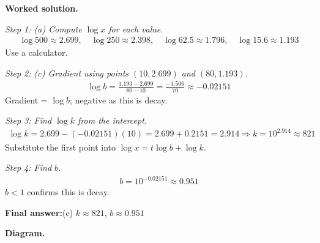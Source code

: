 \documentclass[11pt]{article}
\begin{document}
\textbf{Worked solution.}

\textit{Step 1: (a) Compute \( \log x \) for each value.}
\[\begin{gathered}
\log 500 \approx 2.699, \quad \log 250 \approx 2.398, \quad \log 62.5 \approx 1.796, \quad \log 15.6 \approx 1.193
\end{gathered}\]
Use a calculator.

\textit{Step 2: (c) Gradient using points \( (10, 2.699) \) and \( (80, 1.193) \).}
\[\begin{gathered}
\log b = \frac{1.193 - 2.699}{80 - 10} = \frac{-1.506}{70} \approx -0.02151
\end{gathered}\]
Gradient = \( \log b \); negative as this is decay.

\textit{Step 3: Find \( \log k \) from the intercept.}
\[\begin{gathered}
\log k = 2.699 - (-0.02151)(10) = 2.699 + 0.2151 = 2.914 \Rightarrow k = 10^{2.914} \approx 821
\end{gathered}\]
Substitute the first point into \( \log x = t\log b + \log k \).

\textit{Step 4: Find \( b \).}
\[\begin{gathered}
b = 10^{-0.02151} \approx 0.951
\end{gathered}\]
\( b < 1 \) confirms this is decay.

\begin{answerbox}
\textbf{Final answer:}\quad (c) \(\displaystyle  k \approx 821 \), \(\displaystyle  b \approx 0.951 \)
\end{answerbox}
\textbf{Diagram.}
\end{document}
